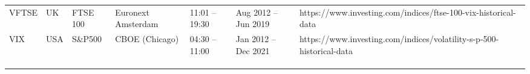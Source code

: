 \documentclass[twoside,twocolumn]{article}
\begin{document}
\begin{table}
{\begin{tabularx}{1.39\textwidth}{ >{\RaggedRight} p{} p{} p{} >{\RaggedRight}  p{} p{} p{} >{\RaggedRight}  p{}}
VFTSE	& UK 			& FTSE 100  		&  Euronext Amsterdam	&   	11:01 -- 19:30	& Aug 2012 -- Jun 2019 &\small{{https://www.investing.com/indices/ftse-100-vix-historical-data}} \\ %
VIX	& USA 		&  S\&P500		&  CBOE (Chicago)		&  04:30 -- 11:00  		& Jan 2012 -- Dec 2021& \small{{https://www.investing.com/indices/volatility-s-p-500-historical-data}}\\ %
\\[-1.5ex]  \hline \\[-3.5ex]  \hline \\[-2ex] 
\end{tabularx} 
}
\end{table} 

\addtocounter{footnote}{-2} %
\newpage
\end{document}
